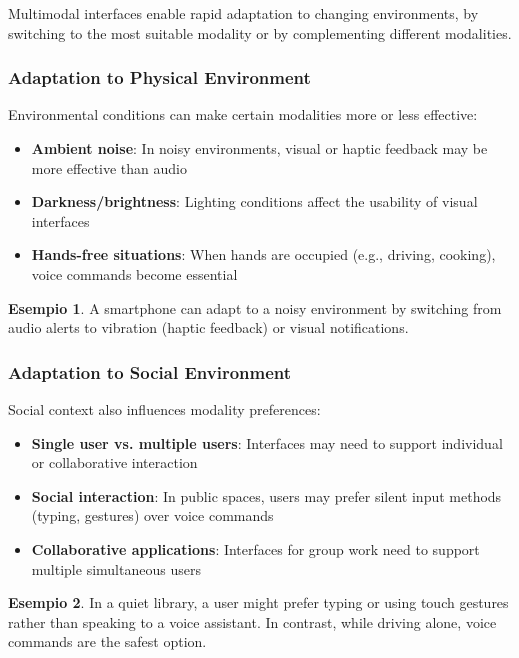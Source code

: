 \documentclass[11pt,a4paper]{article}
\theoremstyle{definition}
\newtheorem{example}{Esempio}[section]
\theoremstyle{plain}
\theoremstyle{remark}
\begin{document}
Multimodal interfaces enable rapid adaptation to changing environments, by switching to the most suitable modality or by complementing different modalities.

\subsubsection{Adaptation to Physical Environment}

Environmental conditions can make certain modalities more or less effective:

\begin{itemize}
    \item \textbf{Ambient noise}: In noisy environments, visual or haptic feedback may be more effective than audio
    \item \textbf{Darkness/brightness}: Lighting conditions affect the usability of visual interfaces
    \item \textbf{Hands-free situations}: When hands are occupied (e.g., driving, cooking), voice commands become essential
\end{itemize}

\begin{example}
A smartphone can adapt to a noisy environment by switching from audio alerts to vibration (haptic feedback) or visual notifications.
\end{example}

\subsubsection{Adaptation to Social Environment}

Social context also influences modality preferences:

\begin{itemize}
    \item \textbf{Single user vs. multiple users}: Interfaces may need to support individual or collaborative interaction
    \item \textbf{Social interaction}: In public spaces, users may prefer silent input methods (typing, gestures) over voice commands
    \item \textbf{Collaborative applications}: Interfaces for group work need to support multiple simultaneous users
\end{itemize}

\begin{example}
In a quiet library, a user might prefer typing or using touch gestures rather than speaking to a voice assistant. In contrast, while driving alone, voice commands are the safest option.
\end{example}
\end{document}
